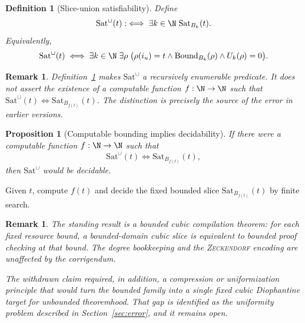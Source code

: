 \documentclass[letterpaper,10pt]{article}
\makeatletter
\theoremstyle{upright}
\theoremstyle{upright}
\newtheorem{remark}[theorem]{Remark}
\newtheorem{definition}[theorem]{Definition}
\newtheorem{proposition}[theorem]{Proposition}
\renewenvironment{proof}[1][Proof]{%
	\par\pushQED{\qed}%
	\normalfont
	\topsep6\p@\@plus6\p@\relax
	\trivlist
	\item[\hskip\labelsep\slshape #1\@addpunct{.}]%
}{%
	\popQED\endtrivlist\@endpefalse
}
\makeatother
\begin{document}
\begin{definition}[Slice-union satisfiability]
\label{def:slice-union-sat}
	Define
	\begin{equation}
	\label{eq:slice-union-sat}
		\mathrm{Sat}^{\cup}(t)
		:\iff
		\exists k\in\N\;\mathrm{Sat}_{B_k}(t).
	\end{equation}
	Equivalently,
	\begin{equation}
	\label{eq:slice-union-expanded}
		\mathrm{Sat}^{\cup}(t)
		\iff
		\exists k\in\N\;\exists\rho\;
		\bigl(\rho(i_u)=t\wedge\mathrm{Bound}_{B_k}(\rho)\wedge U_k(\rho)=0\bigr).
	\end{equation}
\end{definition}

\begin{remark}
	Definition~\ref{def:slice-union-sat} makes $\mathrm{Sat}^{\cup}$ a recursively enumerable predicate. It does \emph{not} assert the existence of a computable function $f:\N\to\N$ such that $\mathrm{Sat}^{\cup}(t)\iff \mathrm{Sat}_{B_{f(t)}}(t)$. The distinction is precisely the source of the error in earlier versions.
\end{remark}

\begin{proposition}[Computable bounding implies decidability]
\label{prop:computable-bound-decidable}
	If there were a computable function $f:\N\to\N$ such that
	\begin{equation}
		\mathrm{Sat}^{\cup}(t)\iff \mathrm{Sat}_{B_{f(t)}}(t),
	\end{equation}
	then $\mathrm{Sat}^{\cup}$ would be decidable.
\end{proposition}

\begin{proof}
	Given $t$, compute $f(t)$ and decide the fixed bounded slice $\mathrm{Sat}_{B_{f(t)}}(t)$ by finite search.
\end{proof}

\begin{remark}
	The standing result is a bounded cubic compilation theorem: for each fixed resource bound, a bounded-domain cubic slice is equivalent to bounded proof checking at that bound. The degree bookkeeping and the \textsc{Zeckendorf} encoding are unaffected by the corrigendum.

	The withdrawn claim required, in addition, a compression or uniformization principle that would turn the bounded family into a single fixed cubic Diophantine target for unbounded theoremhood. That gap is identified as the uniformity problem described in Section~\ref{sec:error}, and it remains open.
\end{remark}
\end{document}
